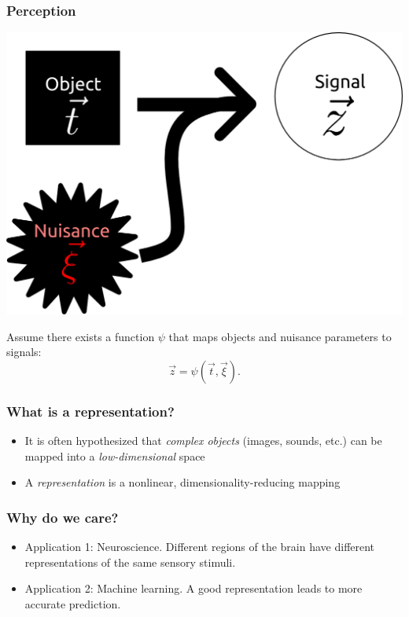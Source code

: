 \documentclass{beamer}
\begin{document}
\begin{frame}
\frametitle{Perception}
\begin{center}
\includegraphics[scale = 0.2]{defense_diagrams/object_signal_nuisance2.png}
\end{center}
Assume there exists a function $\psi$ that maps objects and nuisance parameters to signals:
\[\vec{z} = \psi(\vec{t}, \vec{\xi}).\]
\end{frame}


\begin{frame}
\frametitle{What is a representation?}
\begin{itemize}
\item It is often hypothesized that \emph{complex objects} (images, sounds, etc.) can be mapped into a \emph{low-dimensional} space
\item A \emph{representation} is a nonlinear, dimensionality-reducing mapping
\end{itemize}
\end{frame}

\begin{frame}
\frametitle{Why do we care?}
\begin{itemize}
\item Application 1: Neuroscience.  Different regions of the brain have different representations of the same sensory stimuli.
\item Application 2: Machine learning.  A good representation leads to more accurate prediction.
\end{itemize}
\end{frame}
\end{document}
